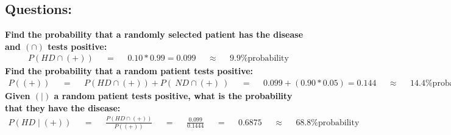 \documentclass[12pt]{article}
\begin{document}
\subsection{Questions:}

  \textbf{Find the probability that a randomly selected patient has the disease and $(\cap)$ tests positive:}
  \begin{align}
    P\left(HD \cap (+)\right) && = && 0.10 * 0.99 = 0.099 && \approx &&
    \text{9.9\% probability}
  \end{align}
  \textbf{Find the probability that a random patient tests positive:}
  \begin{align}
    P\left((+)\right) && = && P\left(HD \cap (+)\right) + P\left(~ND \cap (+)~\right) &&
    = && 0.099 + (0.90 * 0.05) = 0.144 && \approx &&
    \text{14.4\% probability}
  \end{align}
  \textbf{Given $(\mid)$ a random patient tests positive, what is the probability that they have the disease:}
  \begin{align}
    P\left(HD\mid(+)\right) && = &&
    \frac{P\left(HD \cap (+)\right)}{P\left((+)\right)} && = &&
    \frac{0.099}{0.1444} && = && 0.6875 && \approx && \text{68.8\% probability}
  \end{align}
\end{document}

